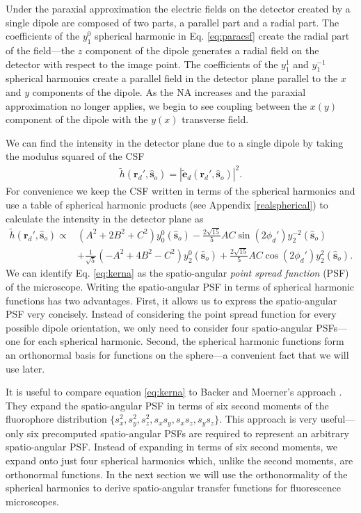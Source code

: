 \documentclass[11pt]{article}
\providecommand{\mb}[1]{\mathbf{#1}}
\providecommand{\so}[1]{\mathbf{\hat{s}}_o}
\providecommand{\rd}[1]{\mathbf{r}_d}
\begin{document}
Under the paraxial approximation the electric fields on the detector created by
a single dipole are composed of two parts, a parallel part and a radial
part. The coefficients of the $y_1^0$ spherical harmonic in Eq. \ref{eq:paracsf}
create the radial part of the field---the $z$ component of the dipole generates
a radial field on the detector with respect to the image point. The coefficients
of the $y_1^1$ and $y_1^{-1}$ spherical harmonics create a parallel field in the
detector plane parallel to the $x$ and $y$ components of the
dipole. As the NA increases and the paraxial approximation no longer applies, we
begin to see coupling between the $x(y)$ component of the dipole with the $y(x)$
transverse field.

We can find the intensity in the detector plane due to a single dipole
by taking the modulus squared of the CSF
\begin{align}
  \tilde{h}(\rd{}', \so{}) = \left|\tilde{\mb{e}}_d(\rd{}', \so{})\right|^2 \label{eq:kernel}.
\end{align}
For convenience we keep the CSF written in terms of the spherical harmonics and
use a table of spherical harmonic products (see Appendix \ref{realspherical}) to
calculate the intensity in the detector plane as
\begin{equation}
  \begin{split}
  \tilde{h}(\rd{}', \so{}) \propto &\left(A^2 + 2B^2 + C^2\right)y_0^0(\so{}) -\frac{2\sqrt{15}}{5}AC\sin(2\phi_d')y_2^{-2}(\so{})\\ &+ \frac{1}{\sqrt{5}}\left(-A^2 + 4B^2 - C^2\right)y_2^{0}(\so{}) +\frac{2\sqrt{15}}{5}AC\cos(2\phi_d')y_2^{2}(\so{}). \label{eq:kerna}
\end{split}
\end{equation}
We can identify Eq. \ref{eq:kerna} as the spatio-angular \textit{point spread
  function} (PSF) of the microscope. Writing the spatio-angular PSF in terms of
spherical harmonic functions has two advantages. First, it allows us to express
the spatio-angular PSF very concisely. Instead of considering the point spread
function for every possible dipole orientation, we only need to consider four
spatio-angular PSFs---one for each spherical harmonic. Second, the spherical
harmonic functions form an orthonormal basis for functions on the sphere---a
convenient fact that we will use later.

It is useful to compare equation \ref{eq:kerna} to Backer and Moerner's approach
\cite{backer2014}. They expand the spatio-angular PSF in terms of six second
moments of the fluorophore distribution
$\{s_x^2, s_y^2, s_z^2, s_xs_y, s_xs_z, s_ys_z\}$. This approach is very
useful---only six precomputed spatio-angular PSFs are required to represent an
arbitrary spatio-angular PSF. Instead of expanding in terms of six second
moments, we expand onto just four spherical harmonics which, unlike the second
moments, are orthonormal functions. In the next section we will use the
orthonormality of the spherical harmonics to derive spatio-angular transfer
functions for fluorescence microscopes.
\end{document}
